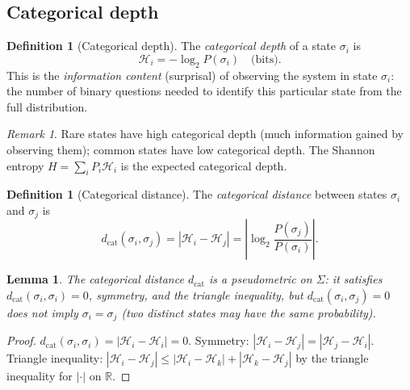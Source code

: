 \documentclass[twocolumn,10pt,a4paper]{article}
\newtheorem{lemma}[theorem]{Lemma}
\theoremstyle{definition}
\newtheorem{definition}[theorem]{Definition}
\theoremstyle{remark}
\newtheorem{remark}[theorem]{Remark}
\newcommand{\R}{\mathbb{R}}
\begin{document}
\subsection{Categorical depth}

\begin{definition}[Categorical depth]\label{def:categorical_depth}
The \emph{categorical depth} of a state $\sigma_i$ is
\begin{equation}\label{eq:categorical_depth}
\mathcal{H}_i = -\log_2 P(\sigma_i) \quad \text{(bits)}.
\end{equation}
This is the \emph{information content} (surprisal) of observing the system in state $\sigma_i$: the number of binary questions needed to identify this particular state from the full distribution.
\end{definition}

\begin{remark}
Rare states have high categorical depth (much information gained by observing them); common states have low categorical depth. The Shannon entropy $H = \sum_i P_i \mathcal{H}_i$ is the expected categorical depth.
\end{remark}

\begin{definition}[Categorical distance]\label{def:categorical_distance}
The \emph{categorical distance} between states $\sigma_i$ and $\sigma_j$ is
\begin{equation}\label{eq:categorical_distance}
d_{\mathrm{cat}}(\sigma_i, \sigma_j) = |\mathcal{H}_i - \mathcal{H}_j| = \left| \log_2 \frac{P(\sigma_j)}{P(\sigma_i)} \right|.
\end{equation}
\end{definition}

\begin{lemma}\label{lem:cat_metric}
The categorical distance $d_{\mathrm{cat}}$ is a pseudometric on $\Sigma$: it satisfies $d_{\mathrm{cat}}(\sigma_i, \sigma_i) = 0$, symmetry, and the triangle inequality, but $d_{\mathrm{cat}}(\sigma_i, \sigma_j) = 0$ does not imply $\sigma_i = \sigma_j$ (two distinct states may have the same probability).
\end{lemma}

\begin{proof}
$d_{\mathrm{cat}}(\sigma_i, \sigma_i) = |\mathcal{H}_i - \mathcal{H}_i| = 0$. Symmetry: $|\mathcal{H}_i - \mathcal{H}_j| = |\mathcal{H}_j - \mathcal{H}_i|$. Triangle inequality: $|\mathcal{H}_i - \mathcal{H}_j| \leq |\mathcal{H}_i - \mathcal{H}_k| + |\mathcal{H}_k - \mathcal{H}_j|$ by the triangle inequality for $|\cdot|$ on $\R$.
\end{proof}
\end{document}
